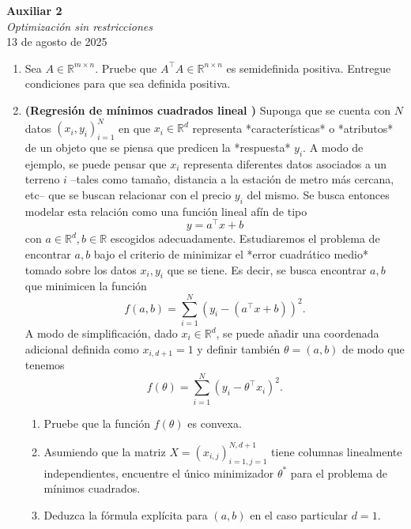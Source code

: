 \documentclass{article}
\begin{document}


\begin{center}
    \Huge{\textbf{Auxiliar 2}}\\
\textit{\large{Optimización sin restricciones}}\\
    \normalsize
    13 de agosto de 2025
\end{center}

\begin{enumerate}
	\item Sea $A \in \mathbb{R}^{m \times n}$. Pruebe que $A^\top A \in \mathbb{R}^{n \times n}$ es semidefinida positiva. Entregue condiciones para que sea definida positiva.

	\item \textbf{(Regresión de mínimos cuadrados lineal
)} Suponga que se cuenta con $N$ datos $(x_i, y_i)_{i=1}^N$ en que $x_i \in \mathbb{R}^d$ representa *características* o *atributos* de un objeto que se piensa que predicen la *respuesta* $y_i$. A modo de ejemplo, se puede pensar que $x_i$ representa diferentes datos asociados a un terreno $i$ --tales como tamaño, distancia a la estación de metro más cercana, etc-- que se buscan relacionar con el precio $y_i$ del mismo. Se busca entonces modelar esta relación como una función lineal afín de tipo
$$
	y = a^\top x + b
$$
con $a \in \mathbb{R}^d, b \in \mathbb{R}$ escogidos adecuadamente. Estudiaremos el problema de encontrar $a, b$ bajo el criterio de minimizar el *error cuadrático medio* tomado sobre los datos $x_i, y_i$ que se tiene. Es decir, se busca encontrar $a, b$ que minimicen la función
$$
	f(a, b) = \sum_{i=1}^N (y_i - (a^\top x + b))^2.
$$
A modo de simplificación, dado $x_i \in \mathbb{R}^d$, se puede añadir una coordenada adicional definida como $x_{i, d+1} = 1$ y definir también $\theta = (a, b)$ de modo que tenemos
$$
	f(\theta) = \sum_{i=1}^N (y_i - \theta^\top x_i)^2.
$$

\begin{enumerate}
	\item Pruebe que la función $f(\theta)$ es convexa.
	\item Asumiendo que la matriz $X = (x_{i,j})_{i=1, j = 1}^{N, d+1}$ tiene columnas linealmente independientes, encuentre el único minimizador $\theta^*$ para el problema de mínimos cuadrados.
	\item Deduzca la fórmula explícita para $(a, b)$ en el caso particular $d=1$.
\end{enumerate}

\end{enumerate}
\end{document}

